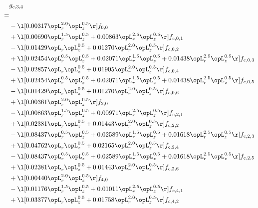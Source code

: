 \begin{alignat}{2} 
\label{eq:g_34_0} 
& g_{c,3,4} \nonumber \\ 
 = \\ 
& - \l[  0.00317 \opL_r^{2.0} \opL_z^{0.5}  \r] f_{0,0} \nonumber \\ 
& + \l[  0.00690 \opL_r^{1.5} \opL_z^{0.5} +  0.00863 \opL_r^{2.5} \opL_z^{0.5}  \r] f_{c,0,1} \nonumber \\ 
& - \l[  0.01429 \opL_r \opL_z^{0.5} +  0.01270 \opL_r^{2.0} \opL_z^{0.5}  \r] f_{c,0,2} \nonumber \\ 
& + \l[  0.02454 \opL_r^{0.5} \opL_z^{0.5} +  0.02071 \opL_r^{1.5} \opL_z^{0.5} +  0.01438 \opL_r^{2.5} \opL_z^{0.5}  \r] f_{c,0,3} \nonumber \\ 
& - \l[  0.02857 \opL_r \opL_z^{0.5} +  0.01905 \opL_r^{2.0} \opL_z^{0.5}  \r] f_{c,0,4} \nonumber \\ 
& + \l[  0.02454 \opL_r^{0.5} \opL_z^{0.5} +  0.02071 \opL_r^{1.5} \opL_z^{0.5} +  0.01438 \opL_r^{2.5} \opL_z^{0.5}  \r] f_{c,0,5} \nonumber \\ 
& - \l[  0.01429 \opL_r \opL_z^{0.5} +  0.01270 \opL_r^{2.0} \opL_z^{0.5}  \r] f_{c,0,6} \nonumber \\ 
& + \l[  0.00361 \opL_r^{2.0} \opL_z^{0.5}  \r] f_{2,0} \nonumber \\ 
& - \l[  0.00863 \opL_r^{1.5} \opL_z^{0.5} +  0.00971 \opL_r^{2.5} \opL_z^{0.5}  \r] f_{c,2,1} \nonumber \\ 
& + \l[  0.02381 \opL_r \opL_z^{0.5} +  0.01443 \opL_r^{2.0} \opL_z^{0.5}  \r] f_{c,2,2} \nonumber \\ 
& - \l[  0.08437 \opL_r^{0.5} \opL_z^{0.5} +  0.02589 \opL_r^{1.5} \opL_z^{0.5} +  0.01618 \opL_r^{2.5} \opL_z^{0.5}  \r] f_{c,2,3} \nonumber \\ 
& + \l[  0.04762 \opL_r \opL_z^{0.5} +  0.02165 \opL_r^{2.0} \opL_z^{0.5}  \r] f_{c,2,4} \nonumber \\ 
& - \l[  0.08437 \opL_r^{0.5} \opL_z^{0.5} +  0.02589 \opL_r^{1.5} \opL_z^{0.5} +  0.01618 \opL_r^{2.5} \opL_z^{0.5}  \r] f_{c,2,5} \nonumber \\ 
& + \l[  0.02381 \opL_r \opL_z^{0.5} +  0.01443 \opL_r^{2.0} \opL_z^{0.5}  \r] f_{c,2,6} \nonumber \\ 
& + \l[  0.00440 \opL_r^{2.0} \opL_z^{0.5}  \r] f_{4,0} \nonumber \\ 
& - \l[  0.01176 \opL_r^{1.5} \opL_z^{0.5} +  0.01011 \opL_r^{2.5} \opL_z^{0.5}  \r] f_{c,4,1} \nonumber \\ 
& + \l[  0.03377 \opL_r \opL_z^{0.5} +  0.01758 \opL_r^{2.0} \opL_z^{0.5}  \r] f_{c,4,2} \nonumber \\ 

\end{alignat}
